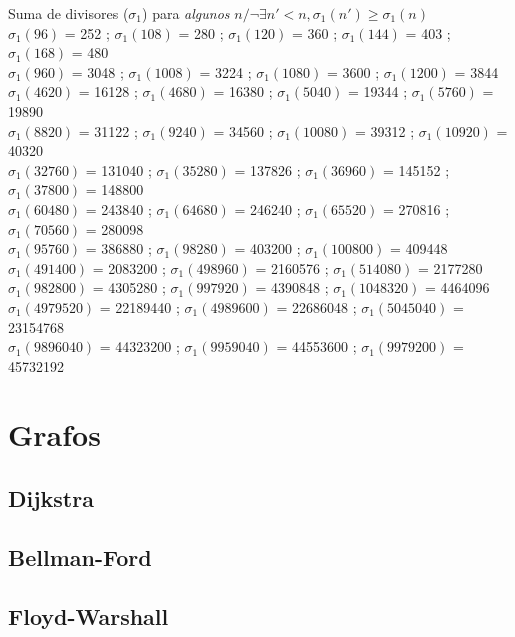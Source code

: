 %
Suma de divisores ($\sigma_1$) para \emph{algunos} $n / \neg\exists n'<n, \sigma_1(n') \geqslant \sigma_1(n)$ \\
$\sigma_1(96)$ = 252 ; $\sigma_1(108)$ = 280 ; $\sigma_1(120)$ = 360 ; $\sigma_1(144)$ = 403 ; $\sigma_1(168)$ = 480 \\
$\sigma_1(960)$ = 3048 ; $\sigma_1(1008)$ = 3224 ; $\sigma_1(1080)$ = 3600 ; $\sigma_1(1200)$ = 3844 \\
$\sigma_1(4620)$ = 16128 ; $\sigma_1(4680)$ = 16380 ; $\sigma_1(5040)$ = 19344 ; $\sigma_1(5760)$ = 19890 \\
$\sigma_1(8820)$ = 31122 ; $\sigma_1(9240)$ = 34560 ; $\sigma_1(10080)$ = 39312 ; $\sigma_1(10920)$ = 40320 \\
$\sigma_1(32760)$ = 131040 ; $\sigma_1(35280)$ = 137826 ; $\sigma_1(36960)$ = 145152 ; $\sigma_1(37800)$ = 148800 \\
$\sigma_1(60480)$ = 243840 ; $\sigma_1(64680)$ = 246240 ; $\sigma_1(65520)$ = 270816 ; $\sigma_1(70560)$ = 280098 \\
$\sigma_1(95760)$ = 386880 ; $\sigma_1(98280)$ = 403200 ; $\sigma_1(100800)$ = 409448  \\
$\sigma_1(491400)$ = 2083200 ; $\sigma_1(498960)$ = 2160576 ; $\sigma_1(514080)$ = 2177280 \\
$\sigma_1(982800)$ = 4305280 ; $\sigma_1(997920)$ = 4390848 ; $\sigma_1(1048320)$ = 4464096 \\
$\sigma_1(4979520)$ = 22189440 ; $\sigma_1(4989600)$ = 22686048 ; $\sigma_1(5045040)$ = 23154768 \\
$\sigma_1(9896040)$ = 44323200 ; $\sigma_1(9959040)$ = 44553600 ; $\sigma_1(9979200)$ = 45732192
%
%


\section{Grafos}%
\subsection{Dijkstra}
\subsection{Bellman-Ford}
\subsection{Floyd-Warshall}

